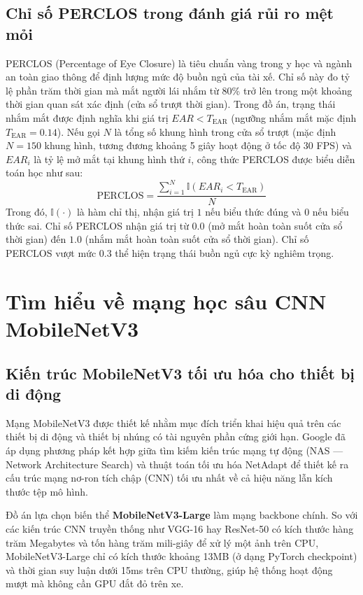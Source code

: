 \documentclass[../DoAn.tex]{subfiles}
\begin{document}
\subsection{Chỉ số PERCLOS trong đánh giá rủi ro mệt mỏi}
PERCLOS (Percentage of Eye Closure) là tiêu chuẩn vàng trong y học và ngành an toàn giao thông để định lượng mức độ buồn ngủ của tài xế. Chỉ số này đo tỷ lệ phần trăm thời gian mà mắt người lái nhắm từ 80\% trở lên trong một khoảng thời gian quan sát xác định (cửa sổ trượt thời gian).
Trong đồ án, trạng thái nhắm mắt được định nghĩa khi giá trị $EAR < T_{\text{EAR}}$ (ngưỡng nhắm mắt mặc định $T_{\text{EAR}} = 0.14$).
Nếu gọi $N$ là tổng số khung hình trong cửa sổ trượt (mặc định $N = 150$ khung hình, tương đương khoảng 5 giây hoạt động ở tốc độ 30 FPS) và $EAR_i$ là tỷ lệ mở mắt tại khung hình thứ $i$, công thức PERCLOS được biểu diễn toán học như sau:
\[ \text{PERCLOS} = \frac{\sum_{i=1}^{N} \mathbb{I}(EAR_i < T_{\text{EAR}})}{N} \]
Trong đó, $\mathbb{I}(\cdot)$ là hàm chỉ thị, nhận giá trị $1$ nếu biểu thức đúng và $0$ nếu biểu thức sai. Chỉ số PERCLOS nhận giá trị từ $0.0$ (mở mắt hoàn toàn suốt cửa sổ thời gian) đến $1.0$ (nhắm mắt hoàn toàn suốt cửa sổ thời gian). Chỉ số PERCLOS vượt mức $0.3$ thể hiện trạng thái buồn ngủ cực kỳ nghiêm trọng.

\section{Tìm hiểu về mạng học sâu CNN MobileNetV3}
\label{section:3.2}

\subsection{Kiến trúc MobileNetV3 tối ưu hóa cho thiết bị di động}
Mạng MobileNetV3 được thiết kế nhằm mục đích triển khai hiệu quả trên các thiết bị di động và thiết bị nhúng có tài nguyên phần cứng giới hạn. Google đã áp dụng phương pháp kết hợp giữa tìm kiếm kiến trúc mạng tự động (NAS --- Network Architecture Search) và thuật toán tối ưu hóa NetAdapt để thiết kế ra cấu trúc mạng nơ-ron tích chập (CNN) tối ưu nhất về cả hiệu năng lẫn kích thước tệp mô hình. 

Đồ án lựa chọn biến thể \textbf{MobileNetV3-Large} làm mạng backbone chính. So với các kiến trúc CNN truyền thống như VGG-16 hay ResNet-50 có kích thước hàng trăm Megabytes và tốn hàng trăm mili-giây để xử lý một ảnh trên CPU, MobileNetV3-Large chỉ có kích thước khoảng 13MB (ở dạng PyTorch checkpoint) và thời gian suy luận dưới 15ms trên CPU thường, giúp hệ thống hoạt động mượt mà không cần GPU đắt đỏ trên xe.
\end{document}
